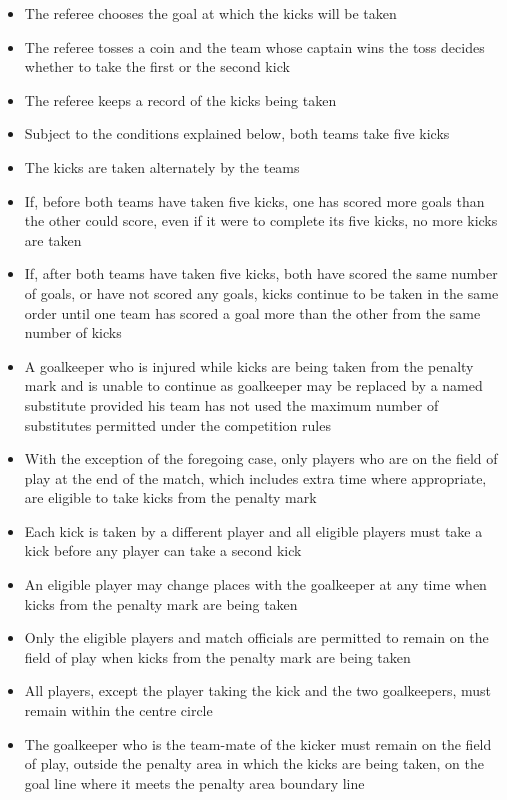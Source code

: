 \begin{itemize}
\item The referee chooses the goal at which the kicks will be taken
\item The referee tosses a coin and the team whose captain wins the toss decides whether to take the first or the second kick
\item The referee keeps a record of the kicks being taken 
\item Subject to the conditions explained below, both teams take five kicks 
\item The kicks are taken alternately by the teams 
\item If, before both teams have taken five kicks, one has scored more goals than the other could score, even if it were to complete its five kicks, no more kicks are taken
\item If, after both teams have taken five kicks, both have scored the same number of goals, or have not scored any goals, kicks continue to be taken in the same order until one team has scored a goal more than the other from the same number of kicks
\item A goalkeeper who is injured while kicks are being taken from the penalty mark and is unable to continue as goalkeeper may be replaced by a named substitute provided his team has not used the maximum number of substitutes permitted under the competition rules
\item With the exception of the foregoing case, only players who are on the field of play at the end of the match, which includes extra time where appropriate, are eligible to take kicks from the penalty mark
\item Each kick is taken by a different player and all eligible players must take a kick before any player can take a second kick
\item An eligible player may change places with the goalkeeper at any time when kicks from the penalty mark are being taken
\item Only the eligible players and match officials are permitted to remain on the field of play when kicks from the penalty mark are being taken
\item All players, except the player taking the kick and the two goalkeepers, must remain within the centre circle
\item The goalkeeper who is the team-mate of the kicker must remain on the field of play, outside the penalty area in which the kicks are being taken, on the goal line where it meets the penalty area boundary line

\end{itemize}
